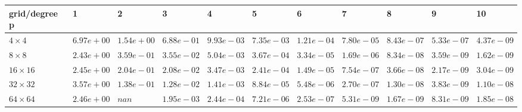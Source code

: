 \begin{tabular}{lllllllllll}
\hline
 grid/degree p   & 1          & 2          & 3          & 4          & 5          & 6          & 7          & 8          & 9          & 10         \\
\hline
 $4 \times 4$    & $6.97e+00$ & $1.54e+00$ & $6.88e-01$ & $9.93e-03$ & $7.35e-03$ & $1.21e-04$ & $7.80e-05$ & $8.43e-07$ & $5.33e-07$ & $4.37e-09$ \\
 $8 \times 8$    & $2.43e+00$ & $3.59e-01$ & $3.55e-02$ & $5.04e-03$ & $3.67e-04$ & $3.34e-05$ & $1.69e-06$ & $8.34e-08$ & $3.59e-09$ & $1.62e-09$ \\
 $16 \times 16$  & $2.45e+00$ & $2.04e-01$ & $2.08e-02$ & $3.47e-03$ & $2.41e-04$ & $1.49e-05$ & $7.54e-07$ & $3.66e-08$ & $2.17e-09$ & $3.04e-09$ \\
 $32 \times 32$  & $3.57e+00$ & $1.38e-01$ & $1.28e-02$ & $1.41e-03$ & $8.84e-05$ & $5.48e-06$ & $2.70e-07$ & $1.30e-08$ & $3.83e-09$ & $1.10e-08$ \\
 $64 \times 64$  & $2.46e+00$ & $nan$      & $1.95e-03$ & $2.44e-04$ & $7.21e-06$ & $2.53e-07$ & $5.31e-09$ & $1.67e-09$ & $8.31e-09$ & $1.85e-08$ \\
\hline
\end{tabular}